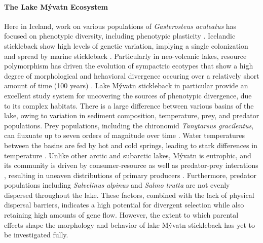 \documentclass[12pt]{extarticle}
\begin{document}
\paragraph{The Lake M\'yvatn Ecosystem}
Here in Iceland, work on various populations of \textit{Gasterosteus aculeatus} has focused on phenotypic diversity, including phenotypic plasticity \citep{Kristjansson2002, Millet2013}. Icelandic stickleback show high levels of genetic variation, implying a single colonization and spread by marine stickleback \citep{Olafsdottir2007}. Particularly in neo-volcanic lakes, resource polymorphism has driven the evolution of sympactric ecotypes \citep{Olafsdottir2007, Kristjansson2002} that show a high degree of morphological and hehavioral divergence occuring over a relatively short amount of time (100 years) \citep{Lucek2014}. Lake M\'yvatn stickleback in particular provide an excellent study system for uncovering the sources of phenotypic divergence, due to its complex habitats. There is a large difference between various basins of the lake, owing to variation in sediment composition, temperature, prey, and predator populations. Prey populations, including the chironomid \textit{Tanytarsus gracilentus}, can fluxuate up to seven orders of magnitude over time \citep{Bartrons2018}.  Water temperatures between the basins are fed by hot and cold springs, leading to stark differences in temperature \citep{Einarsson2004}. Unlike other arctic and subarctic lakes, M\'yvatn is eutrophic, and its community is driven by consumer-resource as well as predator-prey interations \citep{Bartrons2018}, resulting in uneaven distributions of primary producers \citep{Einarsson2004}. Furthermore, predator populations including \textit{Salvelinus alpinus} and \textit{Salmo trutta} are not evenly dispersed throughout the lake. These factors, combined with the lack of physical dispersal barriers, indicates a high potential for divergent selection while also retaining high amounts of gene flow. However, the extent to which parental effects shape the morphology and behavior of lake M\'yvatn stickleback has yet to be investigated fully. 
\end{document}
